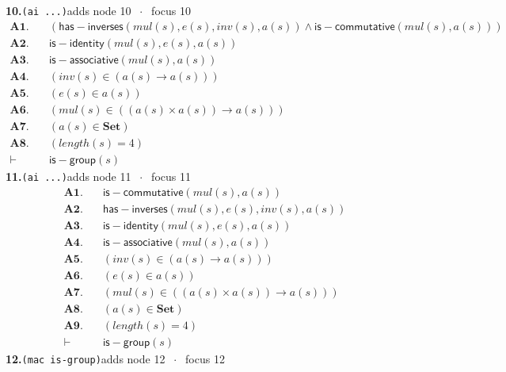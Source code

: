 \documentclass[11pt]{article}
\begin{document}
\medskip\noindent\textbf{10.}\quad \texttt{(ai ...)}\hfill{\small adds node 10 $\;\cdot\;$ focus 10}\\[2pt]
\begin{align*}
  \mathbf{A1.}\quad & (\mathsf{has{-}inverses}(\mathit{mul}(s), e(s), \mathit{inv}(s), a(s)) \wedge \mathsf{is{-}commutative}(\mathit{mul}(s), a(s))) \\
  \mathbf{A2.}\quad & \mathsf{is{-}identity}(\mathit{mul}(s), e(s), a(s)) \\
  \mathbf{A3.}\quad & \mathsf{is{-}associative}(\mathit{mul}(s), a(s)) \\
  \mathbf{A4.}\quad & (\mathit{inv}(s) \in (a(s) \to a(s))) \\
  \mathbf{A5.}\quad & (e(s) \in a(s)) \\
  \mathbf{A6.}\quad & (\mathit{mul}(s) \in ((a(s) \times a(s)) \to a(s))) \\
  \mathbf{A7.}\quad & (a(s) \in \mathbf{Set}) \\
  \mathbf{A8.}\quad & (\mathit{length}(s) = 4) \\
  \vdash\quad & \mathsf{is{-}group}(s)
\end{align*}
\medskip\noindent\textbf{11.}\quad \texttt{(ai ...)}\hfill{\small adds node 11 $\;\cdot\;$ focus 11}\\[2pt]
\begin{align*}
  \mathbf{A1.}\quad & \mathsf{is{-}commutative}(\mathit{mul}(s), a(s)) \\
  \mathbf{A2.}\quad & \mathsf{has{-}inverses}(\mathit{mul}(s), e(s), \mathit{inv}(s), a(s)) \\
  \mathbf{A3.}\quad & \mathsf{is{-}identity}(\mathit{mul}(s), e(s), a(s)) \\
  \mathbf{A4.}\quad & \mathsf{is{-}associative}(\mathit{mul}(s), a(s)) \\
  \mathbf{A5.}\quad & (\mathit{inv}(s) \in (a(s) \to a(s))) \\
  \mathbf{A6.}\quad & (e(s) \in a(s)) \\
  \mathbf{A7.}\quad & (\mathit{mul}(s) \in ((a(s) \times a(s)) \to a(s))) \\
  \mathbf{A8.}\quad & (a(s) \in \mathbf{Set}) \\
  \mathbf{A9.}\quad & (\mathit{length}(s) = 4) \\
  \vdash\quad & \mathsf{is{-}group}(s)
\end{align*}
\medskip\noindent\textbf{12.}\quad \texttt{(mac is-group)}\hfill{\small adds node 12 $\;\cdot\;$ focus 12}\\[2pt]
\end{document}
